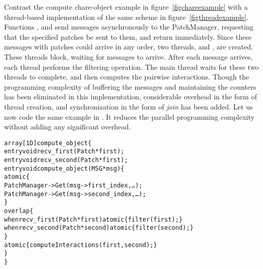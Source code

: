 Contrast the compute chare-object example in figure~\ref{figchareexample} with
a thread-based implementation of the same scheme in
figure~\ref{figthreadexample}. Functions , and  send
messages asynchronously to the PatchManager, requesting that the specified
patches be sent to them, and return immediately. Since these messages with
patches could arrive in any order, two threads,  and
, are created. These threads block, waiting for messages to
arrive. After each message arrives, each thread performs the filtering
operation. The main thread waits for these two threads to complete, and then
computes the pairwise interactions. Though the programming complexity of
buffering the messages and maintaining the counters has been eliminated in this
implementation, considerable overhead in the form of thread creation, and
synchronization in the form of {\em join} has been added. Let us now code the
same example in \sdag. It reduces the parallel programming complexity without
adding any significant overhead.

\begin{center}
\begin{alltt}
  array[1D] compute_object \{
    entry void recv_first(Patch *first);
    entry void recv_second(Patch *first);
    entry void compute_object(MSG *msg)\{
      atomic \{
         PatchManager->Get(msg->first_index,\dots);
         PatchManager->Get(msg->second_index,\dots);
      \}
      overlap \{
        when recv_first(Patch *first) atomic \{ filter(first); \}
        when recv_second(Patch *second) atomic \{ filter(second); \}
      \}
      atomic \{ computeInteractions(first, second); \}
    \}
  \}
\end{alltt}
\end{center}

